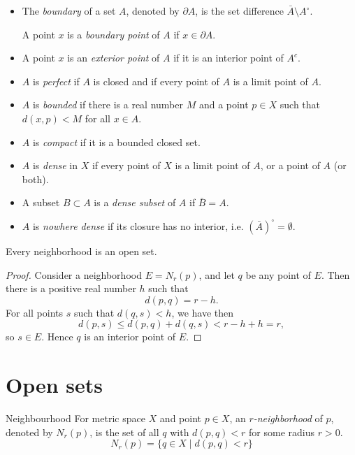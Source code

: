 \begin{itemize}
\item The \emph{boundary} of a set $A$, denoted by $\partial A$, is the set difference $\bar{A}\setminus A^\circ$.

A point $x$ is a \emph{boundary point} of $A$ if $x\in\partial A$.

\item A point $x$ is an \emph{exterior point} of $A$ if it is an interior point of $A^c$.

\item $A$ is \emph{perfect} if $A$ is closed and if every point of $A$ is a limit point of $A$.

\item $A$ is \emph{bounded} if there is a real number $M$ and a point $p \in X$ such that $d(x,p) < M$ for all $x \in A$.

\item $A$ is \emph{compact} if it is a bounded closed set.

\item $A$ is \emph{dense} in $X$ if every point of $X$ is a limit point of $A$, or a point of $A$ (or both).

\item A subset $B\subset A$ is a \emph{dense subset} of $A$ if $\bar{B}=A$.

\item $A$ is \emph{nowhere dense} if its closure has no interior, i.e. $(\bar{A})^\circ=\emptyset$.
\end{itemize}

\begin{thrm}{}{}
Every neighborhood is an open set.
\end{thrm}

\begin{proof}
Consider a neighborhood $E=N_r(p)$, and let $q$ be any point of $E$. Then there is a positive real number $h$ such that
\[ d(p,q) = r-h. \]
For all points $s$ such that $d(q,s)<h$, we have then
\[ d(p,s) \le d(p,q) + d(q,s) < r - h + h = r, \]
so $s \in E$. Hence $q$ is an interior point of $E$.
\end{proof}


\pagebreak

\section{Open sets}
\begin{defn}{Neighbourhood}{}
For metric space $X$ and point $p \in X$, an \emph{$r$-neighborhood} of $p$, denoted by $N_r(p)$, is the set of all $q$ with $d(p,q) < r$ for some radius $r > 0$.
\[ N_r(p) = \{q \in X \mid d(p,q) < r \} \]
\end{defn}

